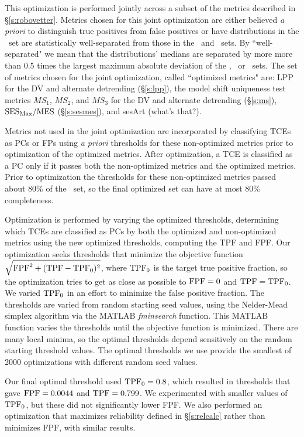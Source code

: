 This optimization is performed jointly across a subset of the metrics described in \S\ref{s:robovetter}.  Metrics chosen for this joint optimization are either believed {\it a priori} to distinguish true positives from false positives or have distributions in the \injtce\ set are statistically well-separated from those in the \scrtce\ and \invtce\ sets.  By ``well-separated" we mean that the distributions' medians are separated by more more than 0.5 times the largest maximum absolute deviation of the \injtce, \scrtce\ or \invtce\ sets.  The set of metrics chosen for the joint optimization, called ``optimized metrics" are: LPP for the DV and alternate detrending (\S\ref{s:lpp}), the model shift uniqueness test metrics $MS_{1}$, $MS_{2}$, and $MS_{3}$ for the DV and alternate detrending (\S\ref{s:ms}), ${{\rm SES}_{\rm Max} / {\rm MES}}$ (\S\ref{s:sesmes}), and sesArt (what's that?). 

Metrics not used in the joint optimization are incorporated by classifying TCEs as PCs or FPs using {\it a priori} thresholds for these non-optimized metrics prior to optimization of the optimized metrics.  After optimization, a TCE is classified as a PC only if it passes both the non-optimized metrics and the optimized metrics.  Prior to optimization the thresholds for these non-optimized metrics passed about 80\% of the  \injtce\ set, so the final optimized set can have at most 80\% completeness.  

Optimization is performed by varying the optimized thresholds, determining which TCEs are classified as PCs by both the optimized and non-optimized metrics using the new optimized thresholds, computing the TPF and FPF.  Our optimization seeks thresholds that minimize the objective function $\sqrt{{\rm FPF}^2 + ({\rm TPF} - {\rm TPF}_0)^2}$, where ${\rm TPF}_0$ is the target true positive fraction, so the optimization tries to get as close as possible to ${\rm FPF} = 0$ and ${\rm TPF} = {\rm TPF}_0$.  We varied ${\rm TPF}_0$ in an effort to minimize the false positive fraction. The thresholds are varied from random starting seed values, using the Nelder-Mead simplex algorithm via the MATLAB {\it fminsearch} function.  This MATLAB function varies the thresholds until the objective function is minimized.  There are many local minima, so the optimal thresholds depend sensitively on the random starting threshold values.  The optimal thresholds we use provide the smallest  of 2000 optimizations with different random seed values.

Our final optimal threshold used ${\rm TPF}_0 = 0.8$, which resulted in thresholds that gave ${\rm FPF} = 0.0044$ and ${\rm TPF} = 0.799$.  We experimented with smaller values of ${\rm TPF}_0$, but these did not significantly lower FPF.   We also performed an optimization that maximizes reliability defined in \S\ref{s:relcalc} rather than minimizes FPF, with similar results.  

